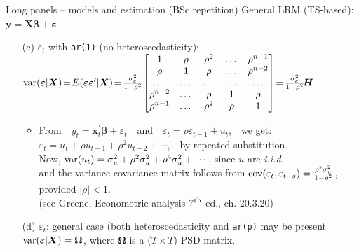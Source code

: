 \documentclass[usenames,dvipsnames]{beamer}
\begin{document}
\begin{frame}{Long panels -- models and estimation (BSc repetition)}
\footnotesize
General LRM (TS-based): $\bm{y} = \bm{X\beta}+\bm{\varepsilon}$\\ \medskip
\begin{itemize}
    \item[(c)] $\varepsilon_t$ with \texttt{ar(1)} (no heteroscedasticity): \\ \medskip $\textnormal{var}(\bm{\varepsilon}|\bm{X}) \! = \! E(\bm{\varepsilon \varepsilon}^{\prime}|\bm{X}) \!=  \!
     \frac{\sigma^2_e}{1-\rho^2} \!
\begin{bmatrix}
1 		& 	\rho 	& \rho^2		& \dots &	\rho^{n-1} \\
\rho 	& 	1 		& \rho 	&  	\dots &	\rho^{n-2}		\\
\dots	& 	\dots 		& \dots 	&  	\dots&	\dots		\\
 \rho^{n-2}		& \dots &	\rho	& 1		&\rho 		\\
\rho^{n-1}&	\dots		& \rho^2	&\rho &		1
\end{bmatrix} \! =\! \frac{\sigma^2_e}{1-\rho^2} \! \bm{H}$ \\ \medskip
\begin{itemize}
    \item From~~$y_t = \bm{x}_t^{\prime}\bm{\beta}+\varepsilon_t$~~and~~$\varepsilon_t = \rho \varepsilon_{t-1}+u_t$,~~we get: \\ \smallskip
    $\varepsilon_t = u_t + \rho u_{t-1} + \rho^2 u_{t-2} + \cdots$,~~by repeated substitution.\\
    Now, $\textnormal{var}(u_t)=\sigma^2_u + \rho^2 \sigma^2_u + \rho^4 \sigma^2_u + \cdots$, since $u$ are \textit{i.i.d.}\\
    and the variance-covariance matrix follows from $\textnormal{cov}(\varepsilon_t,\varepsilon_{t-s})=\tfrac{\rho^s \sigma^2_u}{1-\rho^2}$, provided $|\rho|<1$.\\
    (see Greene, Econometric analysis $7^{\textnormal{th}}$ ed., ch. 20.3.20)
\end{itemize}
    \bigskip
    \item[(d)] $\varepsilon_t$: general case (both heteroscedasticity and \texttt{ar(p)} may be present\\ \medskip
    $\textnormal{var}(\bm{\varepsilon}|\bm{X}) = \bm{\Omega}$, where $\bm{\Omega}$ is a ($T\! \times \! T$) PSD matrix.
\end{itemize}
\end{frame}
\end{document}
